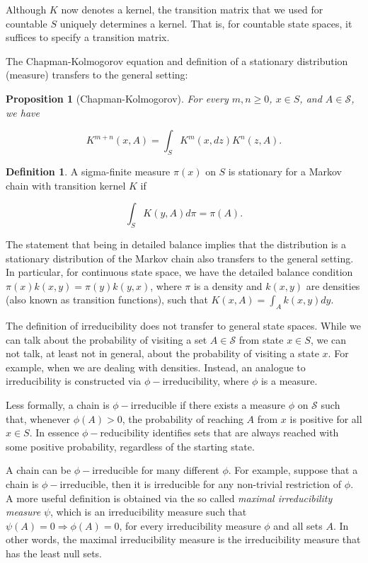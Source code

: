 \documentclass{book}
\theoremstyle{plain}%
\newtheorem{proposition}{Proposition}[section]
\theoremstyle{definition}
\newtheorem{definition}{Definition}[section]
\newlength{\arrow}
\begin{document}
Although $K$ now denotes a kernel, the transition matrix that we used for countable $S$ uniquely determines a kernel. That is, for countable state spaces, it suffices to specify a transition matrix.

The Chapman-Kolmogorov equation and definition of a stationary distribution (measure) transfers to the general setting:

\begin{proposition}[Chapman-Kolmogorov] For every $m, n \geq 0$, $x \in S$, and $A \in \mathcal{S}$, we have

$$K^{m+n}(x, A) = \int_{S} K^m(x,dz)K^n(z,A).$$
\label{prop:chapman}
\end{proposition}

\begin{definition} A sigma-finite measure $\pi(x)$ on $S$ is stationary for a Markov chain with transition kernel $K$ if

$$\int_{S} K(y,A)d\pi = \pi(A).$$
\end{definition}

The statement that being in detailed balance implies that the distribution is a stationary distribution of the Markov chain also transfers to the general setting. In particular, for continuous state space, we have the detailed balance condition $\pi(x)k(x, y) = \pi(y)k(y,x)$, where $\pi$ is a density and $k(x, y)$ are densities (also known as transition functions), such that $K(x, A) = \int_A k(x, y) dy$.

The definition of irreducibility does not transfer to general state spaces. While we can talk about the probability of visiting a set $A \in \mathcal{S}$ from state $x \in S$, we can not talk, at least not in general, about the probability of visiting a state $x$. For example, when we are dealing with densities. Instead, an analogue to irreducibility is constructed via $\phi-$irreducibility, where $\phi$ is a measure.

Less formally, a chain is $\phi-$irreducible if there exists a measure $\phi$ on $\mathcal{S}$ such that, whenever $\phi(A) > 0$, the probability of reaching $A$ from $x$ is positive for all $x \in S$. In essence $\phi-$reducibility identifies sets that are always reached with some positive probability, regardless of the starting state.

A chain can be $\phi-$irreducible for many different $\phi$. For example, suppose that a chain is $\phi-$irreducible, then it is irreducible for any non-trivial restriction of $\phi$. A more useful definition is obtained via the so called \emph{maximal irreducibility measure} $\psi$, which is an irreducibility measure such that $\psi(A) = 0 \Rightarrow \phi(A) = 0$, for every irreducibility measure $\phi$ and all sets $A$. In other words, the maximal irreducibility measure is the irreducibility measure that has the least null sets.
\end{document}
